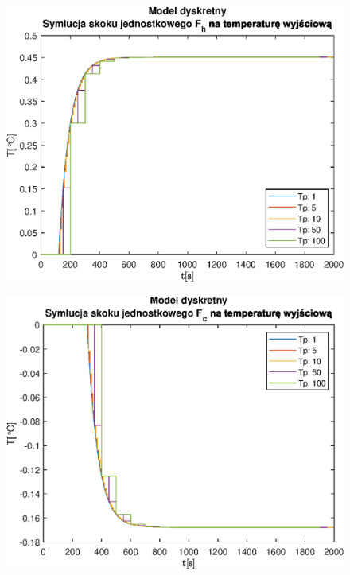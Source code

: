 \begin{figure}[h!]
   \centering
   \includegraphics{img/discrete-step-responses/FhT.eps}
   \caption{}
   \label{}
\end{figure}
            
\begin{figure}[h!]
   \centering
   \includegraphics{img/discrete-step-responses/FcT.eps}
   \caption{}
   \label{}
\end{figure}
            

